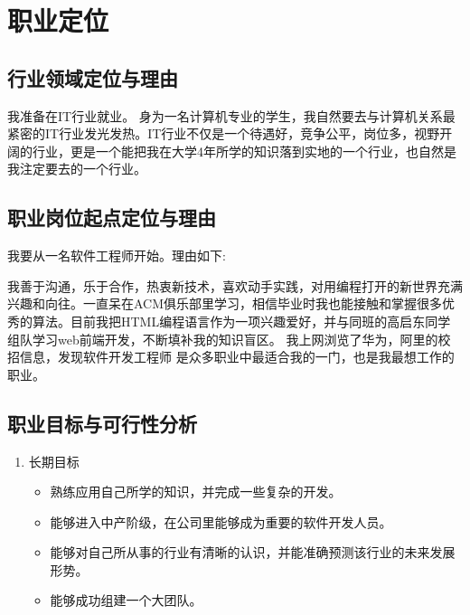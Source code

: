 \documentclass{article}
\begin{document}
\section{职业定位}


\subsection{行业领域定位与理由}
我准备在IT行业就业。
身为一名计算机专业的学生，我自然要去与计算机关系最紧密的IT行业发光发热。IT行业不仅是一个待遇好，竞争公平，岗位多，视野开阔的行业，更是一个能把我在大学4年所学的知识落到实地的一个行业，也自然是我注定要去的一个行业。\par
 
\subsection{职业岗位起点定位与理由}
我要从一名软件工程师开始。理由如下:\par
我善于沟通，乐于合作，热衷新技术，喜欢动手实践，对用编程打开的新世界充满兴趣和向往。一直呆在ACM俱乐部里学习，相信毕业时我也能接触和掌握很多优秀的算法。目前我把HTML编程语言作为一项兴趣爱好，并与同班的高启东同学组队学习web前端开发，不断填补我的知识盲区。
我上网浏览了华为，阿里的校招信息，发现软件开发工程师 是众多职业中最适合我的一门，也是我最想工作的职业。\par
\subsection{职业目标与可行性分析}
\par 
\begin{enumerate}[(1)]
	\begin{itemize}
		\item 熟练掌握C++,python,html,css,javascript等语言。 
		\item 成功与同伴(高启东) 搭建一个校内跳蚤市场交易网络平台。
		\item 学习足量的算法与数据结构有关知识，开阔自己的视野。
		\item 能够成功组建一个小团队。
	\end{itemize}
	\item 长期目标
		\begin{itemize}
		\item 熟练应用自己所学的知识，并完成一些复杂的开发。
		\item 能够进入中产阶级，在公司里能够成为重要的软件开发人员。 
		\item 能够对自己所从事的行业有清晰的认识，并能准确预测该行业的未来发展形势。
		\item 能够成功组建一个大团队。
     	\end{itemize}
\end{enumerate}
\end{document}
